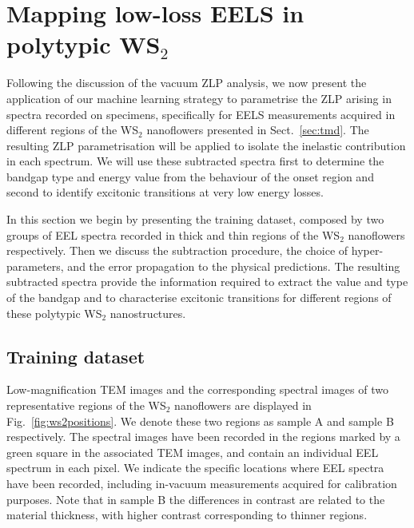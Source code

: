 \section{Mapping low-loss EELS in polytypic WS$_2$}
\label{sec:results_sample}

Following the discussion of the vacuum ZLP analysis, we now
present the application of our machine learning strategy to parametrise the ZLP
arising in spectra recorded on specimens, specifically for
EELS measurements acquired in different regions
of the WS$_2$ nanoflowers presented in Sect.~\ref{sec:tmd}.
%
The resulting ZLP parametrisation will be applied to isolate the inelastic
contribution in each spectrum.
%
We will use these subtracted spectra first to determine the bandgap type and energy 
value from the behaviour of the onset region and second to identify excitonic
transitions at very low energy losses.

In this section we begin by presenting the training dataset, composed by two groups of EEL spectra recorded
in thick and thin regions of the WS$_2$  nanoflowers respectively.
%
Then we discuss the subtraction procedure, the choice of hyper-parameters, and the error propagation
to the physical predictions.
%
The resulting subtracted spectra provide the information
required to extract the value and type of the bandgap
and to characterise excitonic transitions for different regions of these polytypic WS$_2$ nanostructures.

\subsection{Training dataset}

Low-magnification TEM images  and the corresponding
spectral images of two representative regions of
the WS$_2$ nanoflowers are displayed in Fig.~\ref{fig:ws2positions}.
%
We denote these two regions as sample A and sample B respectively.
%
The spectral images have been recorded in the regions marked by a green square
    in the associated TEM images, and contain an individual EEL spectrum in each pixel.
%
We indicate the specific locations where
EEL spectra have been recorded, including in-vacuum measurements acquired
for calibration purposes.
%
Note that in sample B  the differences in contrast are related to the material
thickness, with higher contrast corresponding to thinner regions.

